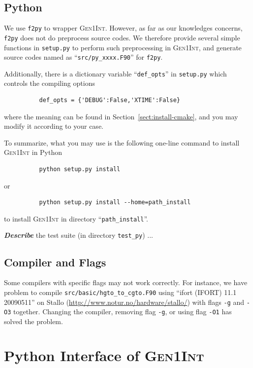 \documentclass[a4paper,11pt,twoside,openright]{book}
\newcommand{\fixme}[1]{\textbf{\textit{\color{red} #1}}}
\begin{document}
\section{Python}
\label{sect:install-python}

We use \verb|f2py| to wrapper \textsc{Gen1Int}. However, as far as our knowledges concerns,
\verb|f2py| does not do preprocess source codes. We therefore provide several simple functions
in \verb|setup.py| to perform such preprocessing in \textsc{Gen1Int}, and generate source codes
named as ``\verb|src/py_xxxx.F90|'' for \verb|f2py|.

Additionally, there is a dictionary variable ``\verb|def_opts|'' in \verb|setup.py| which controls the
compiling options
\begin{verbatim}
          def_opts = {'DEBUG':False,'XTIME':False}
\end{verbatim}
where the meaning can be found in Section~\ref{sect:install-cmake}, and you may modify it
according to your case.

To summarize, what you may use is the following one-line command to install \textsc{Gen1Int} in Python
\begin{verbatim}
          python setup.py install
\end{verbatim}
or
\begin{verbatim}
          python setup.py install --home=path_install
\end{verbatim}
to install \textsc{Gen1Int} in directory ``\verb|path_install|''.

\fixme{Describe} the test suite (in directory \verb|test_py|) ...

\section{Compiler and Flags}
\label{sect:compiler-flag}

Some compilers with specific flags may not work correctly. For instance, we have problem to
compile \verb|src/basic/hgto_to_cgto.F90| using ``ifort (IFORT) 11.1 20090511'' on Stallo
(\url{http://www.notur.no/hardware/stallo/}) with flags \verb|-g| and \verb|-O3| together. Changing
the compiler, removing flag \verb|-g|, or using flag \verb|-O1| has solved the problem.

\chapter{Python Interface of \textsc{Gen1Int}}
\label{chap:python-ifc}
\end{document}
